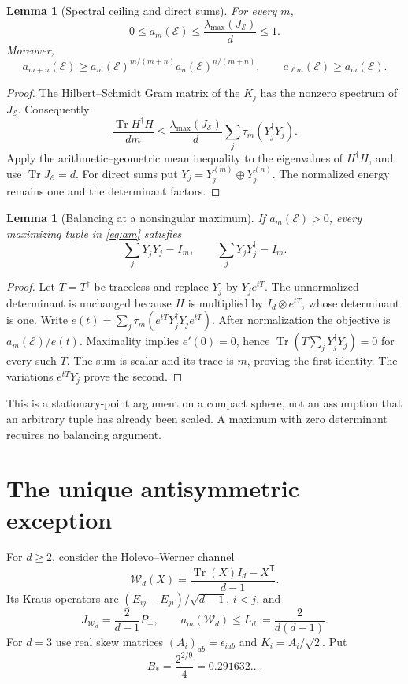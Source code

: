 \documentclass[11pt,a4paper]{article}
\newtheorem{lemma}[theorem]{Lemma}
\theoremstyle{remark}\newtheorem{remark}[theorem]{Remark}
\newcommand{\Tr}{\operatorname{Tr}}
\newcommand{\E}{\mathcal E}
\newcommand{\W}{\mathcal W}
\begin{document}
\begin{lemma}[Spectral ceiling and direct sums]\label{lem:elementary}
For every \(m\),
\[
 0\le a_m(\E)\le \frac{\lambda_{\max}(J_\E)}d\le1 .
\]
Moreover,
\[
 a_{m+n}(\E)\ge
 a_m(\E)^{m/(m+n)}a_n(\E)^{n/(m+n)},\qquad
 a_{\ell m}(\E)\ge a_m(\E).
\]
\end{lemma}
\begin{proof}
The Hilbert--Schmidt Gram matrix of the \(K_j\) has the nonzero spectrum of \(J_\E\). Consequently
\[
 \frac{\Tr H^\dagger H}{dm}
 \le \frac{\lambda_{\max}(J_\E)}d
       \sum_j\tau_m(Y_j^\dagger Y_j).
\]
Apply the arithmetic--geometric mean inequality to the eigenvalues of
\(H^\dagger H\), and use \(\Tr J_\E=d\).
For direct sums put \(Y_j=Y_j^{(m)}\oplus Y_j^{(n)}\).
The normalized energy remains one and the determinant factors.
\end{proof}

\begin{lemma}[Balancing at a nonsingular maximum]\label{lem:balance}
If \(a_m(\E)>0\), every maximizing tuple in \eqref{eq:am} satisfies
\begin{equation}\label{eq:balance}
 \sum_jY_j^\dagger Y_j=I_m,\qquad
 \sum_jY_jY_j^\dagger=I_m .
\end{equation}
\end{lemma}
\begin{proof}
Let \(T=T^\dagger\) be traceless and replace \(Y_j\) by \(Y_je^{tT}\).
The unnormalized determinant is unchanged because
\(H\) is multiplied by \(I_d\otimes e^{tT}\), whose determinant is one.
Write \(e(t)=\sum_j\tau_m(e^{tT}Y_j^\dagger Y_je^{tT})\).
After normalization the objective is \(a_m(\E)/e(t)\).
Maximality implies \(e'(0)=0\), hence
\(\Tr(T\sum_jY_j^\dagger Y_j)=0\) for every such \(T\).
The sum is scalar and its trace is \(m\), proving the first identity.
The variations \(e^{tT}Y_j\) prove the second.
\end{proof}

This is a stationary-point argument on a compact sphere, not an assumption that an arbitrary tuple has already been scaled. A maximum with zero determinant requires no balancing argument.

\section{The unique antisymmetric exception}
For \(d\ge2\), consider the Holevo--Werner channel
\[
 \W_d(X)=\frac{\Tr(X)I_d-X^{\mathsf T}}{d-1}.
\]
Its Kraus operators are \((E_{ij}-E_{ji})/\sqrt{d-1}\), \(i<j\), and
\[
 J_{\W_d}=\frac{2}{d-1}P_-,
 \qquad a_m(\W_d)\le L_d:=\frac{2}{d(d-1)}.
\]
For \(d=3\) use real skew matrices \((A_i)_{ab}=\epsilon_{iab}\) and
\(K_i=A_i/\sqrt2\). Put
\[
 B_*=\frac{2^{2/9}}4=0.291632\ldots .
\]
\end{document}
